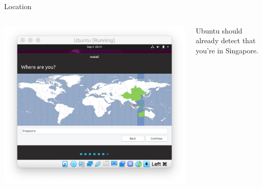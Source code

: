 \documentclass[11pt]{beamer}
\begin{document}
\begin{frame}{Location}
  \begin{columns}
    \begin{column}{0.65\linewidth}
      \includegraphics[width=\linewidth]{ubuntu-tz}
    \end{column}
    \begin{column}{0.35\linewidth}
      Ubuntu should already detect that you're in Singapore.
    \end{column}
  \end{columns}
\end{frame}
\end{document}
